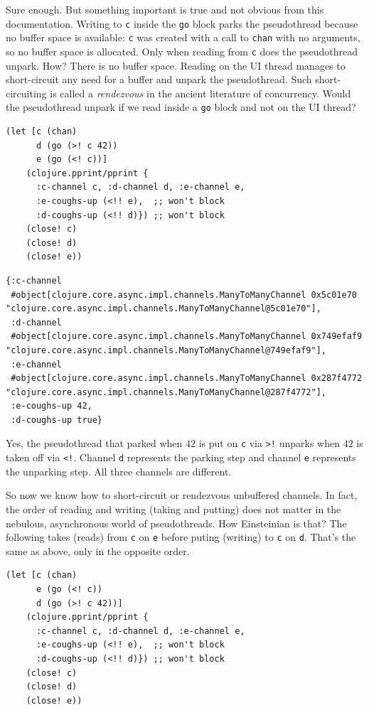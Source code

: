 \documentclass[10pt,oneside,x11names]{article}
\begin{document}
Sure enough. But something important is true and not obvious from this
documentation. Writing to \texttt{c} inside the \texttt{go} block parks the
pseudothread because no buffer space is available: \texttt{c} was created with
a call to \texttt{chan} with no arguments, so no buffer space is allocated.
Only when reading from \texttt{c} does the pseudothread unpark. How? There is
no buffer space. Reading on the UI thread manages to short-circuit any
need for a buffer and unpark the pseudothread. Such short-circuiting is
called a \emph{rendezvous} in the ancient literature of concurrency. Would
the pseudothread unpark if we read inside a \texttt{go} block and not on the UI
thread?

\begin{verbatim}
(let [c (chan)
      d (go (>! c 42))
      e (go (<! c))]
    (clojure.pprint/pprint {
      :c-channel c, :d-channel d, :e-channel e,
      :e-coughs-up (<!! e),  ;; won't block
      :d-coughs-up (<!! d)}) ;; won't block
    (close! c)
    (close! d)
    (close! e))
\end{verbatim}

\begin{verbatim}
{:c-channel
 #object[clojure.core.async.impl.channels.ManyToManyChannel 0x5c01e70 "clojure.core.async.impl.channels.ManyToManyChannel@5c01e70"],
 :d-channel
 #object[clojure.core.async.impl.channels.ManyToManyChannel 0x749efaf9 "clojure.core.async.impl.channels.ManyToManyChannel@749efaf9"],
 :e-channel
 #object[clojure.core.async.impl.channels.ManyToManyChannel 0x287f4772 "clojure.core.async.impl.channels.ManyToManyChannel@287f4772"],
 :e-coughs-up 42,
 :d-coughs-up true}
\end{verbatim}


Yes, the pseudothread that parked when \(42\) is put on \texttt{c} via \texttt{>!}
unparks when \(42\) is taken off via \texttt{<!}. Channel \texttt{d} represents the
parking step and channel \texttt{e} represents the unparking step. All three
channels are different.

So now we know how to short-circuit or rendezvous unbuffered channels.
In fact, the order of reading and writing (taking and putting) does not
matter in the nebulous, asynchronous world of pseudothreads. How
Einsteinian is that? The following takes (reads) from \texttt{c} on \texttt{e} before
puting (writing) to \texttt{c} on \texttt{d}. That's the same as above, only in the
opposite order.

\begin{verbatim}
(let [c (chan)
      e (go (<! c))
      d (go (>! c 42))]
    (clojure.pprint/pprint {
      :c-channel c, :d-channel d, :e-channel e,
      :e-coughs-up (<!! e),  ;; won't block
      :d-coughs-up (<!! d)}) ;; won't block
    (close! c)
    (close! d)
    (close! e))
\end{verbatim}
\end{document}
